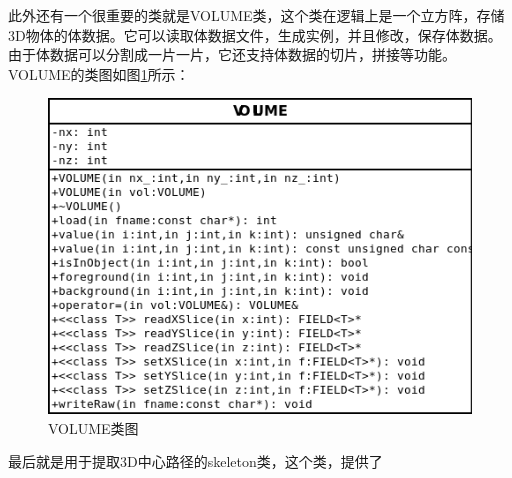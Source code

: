 此外还有一个很重要的类就是VOLUME类，这个类在逻辑上是一个立方阵，存储3D物体的体数据。它可以读取体数据文件，生成实例，并且修改，保存体数据。由于体数据可以分割成一片一片，它还支持体数据的切片，拼接等功能。
VOLUME的类图如图\ref{volume-class}所示：
\begin{figure}[h!]
    \centering
    \includegraphics[width=300bp]{figure/volume.png}
    \caption{VOLUME类图}
    \label{volume-class}
\end{figure}

最后就是用于提取3D中心路径的skeleton类，这个类，提供了
